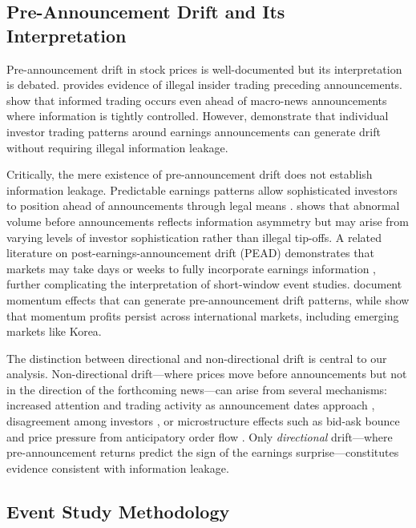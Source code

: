 \documentclass[manuscript,review]{acmart}
\begin{document}
\subsection{Pre-Announcement Drift and Its Interpretation}

Pre-announcement drift in stock prices is well-documented but its interpretation is debated. \citet{meulbroek1992comparison} provides evidence of illegal insider trading preceding announcements. \citet{bernile2016can} show that informed trading occurs even ahead of macro-news announcements where information is tightly controlled. However, \citet{kaniel2012individual} demonstrate that individual investor trading patterns around earnings announcements can generate drift without requiring illegal information leakage.

Critically, the mere existence of pre-announcement drift does not establish information leakage. Predictable earnings patterns allow sophisticated investors to position ahead of announcements through legal means \cite{atiase1985predisclosure}. \citet{chae2005trading} shows that abnormal volume before announcements reflects information asymmetry but may arise from varying levels of investor sophistication rather than illegal tip-offs. A related literature on post-earnings-announcement drift (PEAD) demonstrates that markets may take days or weeks to fully incorporate earnings information \cite{bernard1989post, bernard1990evidence}, further complicating the interpretation of short-window event studies. \citet{jegadeesh2001profitability} document momentum effects that can generate pre-announcement drift patterns, while \citet{griffin2003momentum} show that momentum profits persist across international markets, including emerging markets like Korea.

The distinction between directional and non-directional drift is central to our analysis. Non-directional drift---where prices move before announcements but not in the direction of the forthcoming news---can arise from several mechanisms: increased attention and trading activity as announcement dates approach \cite{hirshleifer2003limited}, disagreement among investors \cite{bamber1997trading}, or microstructure effects such as bid-ask bounce and price pressure from anticipatory order flow \cite{hasbrouck2003intraday}. Only \textit{directional} drift---where pre-announcement returns predict the sign of the earnings surprise---constitutes evidence consistent with information leakage.

\subsection{Event Study Methodology}
\end{document}
